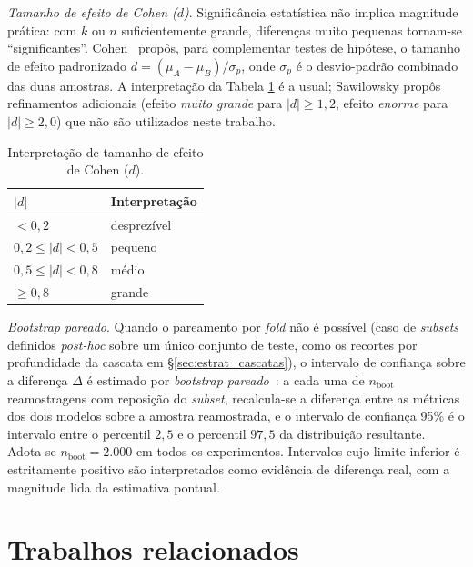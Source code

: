 \emph{Tamanho de efeito de Cohen ($d$)}. Signific\^ancia estat\'istica
n\~ao implica magnitude pr\'atica: com $k$ ou $n$ suficientemente
grande, diferen\c{c}as muito pequenas tornam-se ``significantes''.
Cohen~\cite{cohen1988statistical} prop\^os, para complementar testes
de hip\'otese, o tamanho de efeito padronizado
$d = (\mu_A - \mu_B) / \sigma_p$, onde $\sigma_p$ \'e o desvio-padr\~ao
combinado das duas amostras. A interpreta\c{c}\~ao da Tabela
\ref{tab:cohen_d_interpretacao} \'e a usual; Sawilowsky
\cite{sawilowsky2009effect} prop\^os refinamentos adicionais (efeito
\emph{muito grande} para $|d| \geq 1{,}2$, efeito \emph{enorme} para
$|d| \geq 2{,}0$) que n\~ao s\~ao utilizados neste trabalho.

\begin{table}[h]\centering
\caption{Interpreta\c{c}\~ao de tamanho de efeito de Cohen ($d$).}
\label{tab:cohen_d_interpretacao}
\begin{tabular}{ll}
\toprule
$|d|$           & Interpreta\c{c}\~ao \\
\midrule
$< 0{,}2$         & desprez\'ivel \\
$0{,}2 \leq |d| < 0{,}5$ & pequeno \\
$0{,}5 \leq |d| < 0{,}8$ & m\'edio \\
$\geq 0{,}8$      & grande \\
\bottomrule
\end{tabular}
\end{table}

\emph{Bootstrap pareado}. Quando o pareamento por \emph{fold} n\~ao
\'e poss\'ivel (caso de \emph{subsets} definidos \emph{post-hoc}
sobre um \'unico conjunto de teste, como os recortes por profundidade
da cascata em \S\ref{sec:estrat_cascatas}), o intervalo de
confian\c{c}a sobre a diferen\c{c}a $\Delta$ \'e estimado por
\emph{bootstrap pareado}~\cite{efron1993bootstrap}: a cada uma de
$n_{\mathrm{boot}}$ reamostragens com reposi\c{c}\~ao do \emph{subset},
recalcula-se a diferen\c{c}a entre as m\'etricas dos dois modelos
sobre a amostra reamostrada, e o intervalo de confian\c{c}a 95\% \'e
o intervalo entre o percentil $2{,}5$ e o percentil $97{,}5$ da
distribui\c{c}\~ao resultante. Adota-se $n_{\mathrm{boot}} = 2.000$
em todos os experimentos. Intervalos cujo limite inferior \'e
estritamente positivo s\~ao interpretados como evid\^encia de
diferen\c{c}a real, com a magnitude lida da estimativa pontual.

\section{Trabalhos relacionados}
\label{sec:relacionados}

